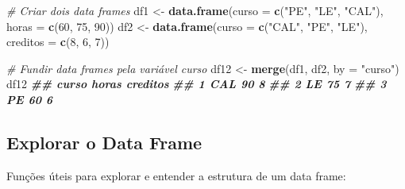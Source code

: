 \documentclass[
]{book}
\newenvironment{Shaded}{\begin{snugshade}}{\end{snugshade}}
\newcommand{\AttributeTok}[1]{\textcolor[rgb]{0.13,0.29,0.53}{#1}}
\newcommand{\CommentTok}[1]{\textcolor[rgb]{0.56,0.35,0.01}{\textit{#1}}}
\newcommand{\DecValTok}[1]{\textcolor[rgb]{0.00,0.00,0.81}{#1}}
\newcommand{\DocumentationTok}[1]{\textcolor[rgb]{0.56,0.35,0.01}{\textbf{\textit{#1}}}}
\newcommand{\FunctionTok}[1]{\textcolor[rgb]{0.13,0.29,0.53}{\textbf{#1}}}
\newcommand{\NormalTok}[1]{#1}
\newcommand{\OtherTok}[1]{\textcolor[rgb]{0.56,0.35,0.01}{#1}}
\newcommand{\StringTok}[1]{\textcolor[rgb]{0.31,0.60,0.02}{#1}}
\begin{document}
\begin{Shaded}
\begin{Highlighting}[]
\CommentTok{\# Criar dois data frames}
\NormalTok{df1 }\OtherTok{\textless{}{-}} \FunctionTok{data.frame}\NormalTok{(}\AttributeTok{curso =} \FunctionTok{c}\NormalTok{(}\StringTok{"PE"}\NormalTok{, }\StringTok{"LE"}\NormalTok{, }\StringTok{"CAL"}\NormalTok{), }\AttributeTok{horas =} \FunctionTok{c}\NormalTok{(}\DecValTok{60}\NormalTok{, }\DecValTok{75}\NormalTok{, }\DecValTok{90}\NormalTok{))}
\NormalTok{df2 }\OtherTok{\textless{}{-}} \FunctionTok{data.frame}\NormalTok{(}\AttributeTok{curso =} \FunctionTok{c}\NormalTok{(}\StringTok{"CAL"}\NormalTok{, }\StringTok{"PE"}\NormalTok{, }\StringTok{"LE"}\NormalTok{), }\AttributeTok{creditos =} \FunctionTok{c}\NormalTok{(}\DecValTok{8}\NormalTok{, }\DecValTok{6}\NormalTok{, }\DecValTok{7}\NormalTok{))}

\CommentTok{\# Fundir data frames pela variável \textquotesingle{}curso\textquotesingle{}}
\NormalTok{df12 }\OtherTok{\textless{}{-}} \FunctionTok{merge}\NormalTok{(df1, df2, }\AttributeTok{by =} \StringTok{"curso"}\NormalTok{)}
\NormalTok{df12}
\DocumentationTok{\#\#   curso horas creditos}
\DocumentationTok{\#\# 1   CAL    90        8}
\DocumentationTok{\#\# 2    LE    75        7}
\DocumentationTok{\#\# 3    PE    60        6}
\end{Highlighting}
\end{Shaded}

\subsection{Explorar o Data Frame}\label{explorar-o-data-frame}

Funções úteis para explorar e entender a estrutura de um data frame:
\end{document}
